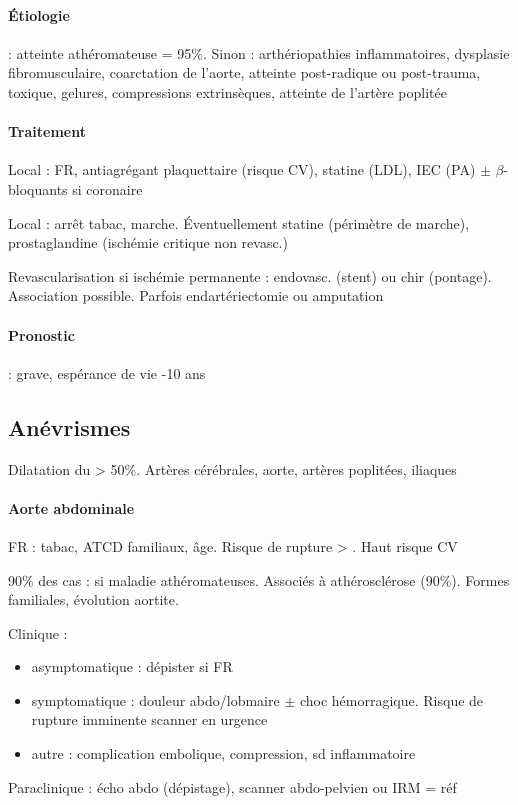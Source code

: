 \paragraph{Étiologie} : atteinte athéromateuse = 95\%. Sinon : arthériopathies
inflammatoires, dysplasie fibromusculaire, coarctation de l'aorte, atteinte
post-radique ou post-trauma, toxique, gelures, compressions extrinsèques,
atteinte de l'artère poplitée
    
\paragraph{Traitement}
Local : FR, antiagrégant plaquettaire (risque CV), statine (LDL), IEC (PA) $\pm$
$\beta$-bloquants si coronaire

Local : arrêt tabac, marche. Éventuellement statine (périmètre de marche),
prostaglandine (ischémie critique non revasc.)

Revascularisation si ischémie permanente : endovasc. (stent) ou chir (pontage).
Association possible. Parfois endartériectomie ou amputation

\paragraph{Pronostic} : grave, espérance de vie -10 ans

\subsection{Anévrismes}
Dilatation du \diameter{} > 50\%. Artères cérébrales, aorte, artères poplitées, iliaques

\paragraph{Aorte abdominale}
FR : tabac, ATCD familiaux, âge. Risque de rupture > \female. Haut risque CV

90\% des cas : si maladie athéromateuses. Associés à athérosclérose (90\%).
Formes familiales, évolution aortite.

Clinique : 
\begin{itemize}
  \item asymptomatique : dépister si FR
  \item symptomatique : douleur abdo/lobmaire $\pm$ choc hémorragique. Risque de
    rupture imminente \thus scanner en urgence \skull
  \item autre : complication embolique, compression, sd inflammatoire
\end{itemize}
Paraclinique : écho abdo (dépistage), scanner abdo-pelvien ou IRM = réf

